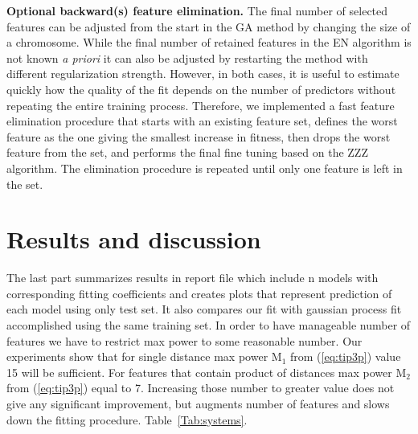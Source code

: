 \documentclass[aps,prl,reprint,amsmath,amssymb,nature]{revtex4-1}
\begin{document}
\textbf{Optional backward(s) feature elimination.} 
The final number of selected features can be adjusted from the start in the GA method by changing the size of a chromosome. 
While the final number of retained features in the EN algorithm is not known \emph{a priori} it can also be adjusted by restarting the method with different regularization strength. 
However, in both cases, it is useful to estimate quickly how the quality of the fit depends on the number of predictors without repeating the entire training process. 
Therefore, we implemented a fast feature elimination procedure that starts with an existing feature set, defines the worst feature as the one giving the smallest increase in fitness, then drops the worst feature from the set, and performs the final fine tuning based on the ZZZ algorithm.  The elimination procedure is repeated until only one feature is left in the set.



\section{Results and discussion}

The last part summarizes results in report file which include n models 
with corresponding fitting coefficients and creates plots that represent 
prediction of each model using only test set. It also compares our fit 
with gaussian process fit accomplished using the same training set. In 
order to have manageable number of features we have to restrict max power to some reasonable number. Our experiments show that for single distance max power M$_{1}$ from (\ref{eq:tip3p}) value 15 will be sufficient. For features that contain product of distances max power M$_{2}$ from (\ref{eq:tip3p}) 
equal to 7. Increasing those number to greater value does not give any 
significant improvement, but augments number of features and slows down 
the fitting procedure. Table~\ref{Tab:systems}.
\end{document}
